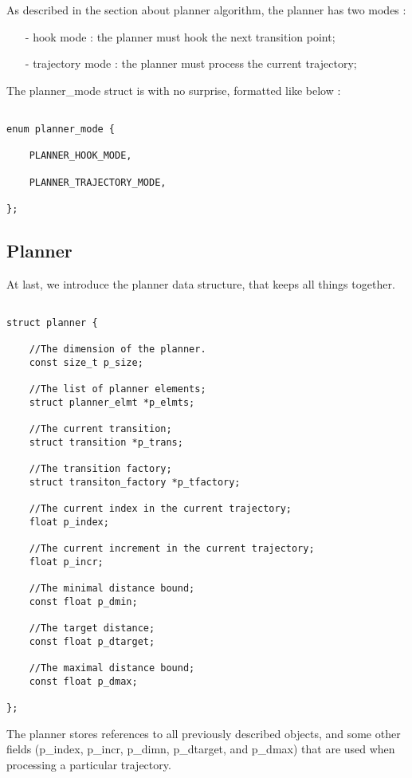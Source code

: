 As described in the section about planner algorithm, the planner has two modes : 
\begin{itemize}
\item[-] hook mode : the planner must hook the next transition point;
\item[-] trajectory mode : the planner must process the current trajectory;
\end{itemize}

The planner\_mode struct is with no surprise, formatted like below : 

\begin{lstlisting}[style=Cstyle]

enum planner_mode {
	
	PLANNER_HOOK_MODE, 
	
	PLANNER_TRAJECTORY_MODE,
	
};

\end{lstlisting}


\subsection{Planner}

At last, we introduce the planner data structure, that keeps all things together. 


\begin{lstlisting}[style=Cstyle]

struct planner {
	
	//The dimension of the planner.
	const size_t p_size;

	//The list of planner elements;
	struct planner_elmt *p_elmts;
	
	//The current transition;
	struct transition *p_trans;
	
	//The transition factory;
	struct transiton_factory *p_tfactory;
	
	//The current index in the current trajectory;
	float p_index;

	//The current increment in the current trajectory;
	float p_incr;
	
	//The minimal distance bound;
	const float p_dmin;
	
	//The target distance;
	const float p_dtarget;
	
	//The maximal distance bound;
	const float p_dmax;
	
};

\end{lstlisting}

The planner stores references to all previously described objects, and some other fields (p\_index, p\_incr, 
p\_dimn, p\_dtarget, and p\_dmax) that are used when processing a particular trajectory. 

